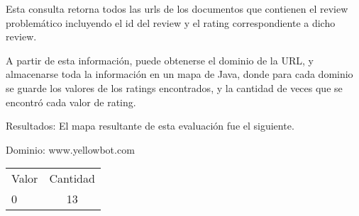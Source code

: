Esta consulta retorna todos las urls de los documentos que contienen el review problemático incluyendo el id del review y el 
rating correspondiente a dicho review.

A partir de esta información, puede obtenerse el dominio de la URL, y almacenarse toda la información en un mapa de Java, donde para cada dominio se 
guarde los valores de los ratings encontrados, y la cantidad de veces que se encontró cada valor de rating.

Resultados:
El mapa resultante de esta evaluación fue el siguiente.

Dominio: www.yellowbot.com\\
\begin{tabular}{| l | c |}
 Valor & Cantidad\\
 0 & 13\\
\end{tabular}

